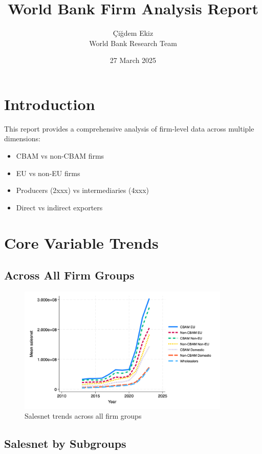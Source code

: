 \documentclass{article}
\title{World Bank Firm Analysis Report}
\author{\c{C}i\u{g}dem Ekiz \\ World Bank Research Team}
\date{27 March 2025}
\begin{document}
\maketitle
\section{Introduction}
This report provides a comprehensive analysis of firm-level data across multiple dimensions:
\begin{itemize}
\item CBAM vs non-CBAM firms
\item EU vs non-EU firms
\item Producers (2xxx) vs intermediaries (4xxx)
\item Direct vs indirect exporters
\end{itemize}

\section{Core Variable Trends}
\subsection{Across All Firm Groups}
\begin{figure}[h!]
\centering
\includegraphics[width=0.9\textwidth]{salesnet_main_groups.png}
\caption{Salesnet trends across all firm groups}
\label{fig:salesnet_main}
\end{figure}

\subsection{Salesnet by Subgroups}
\end{document}
